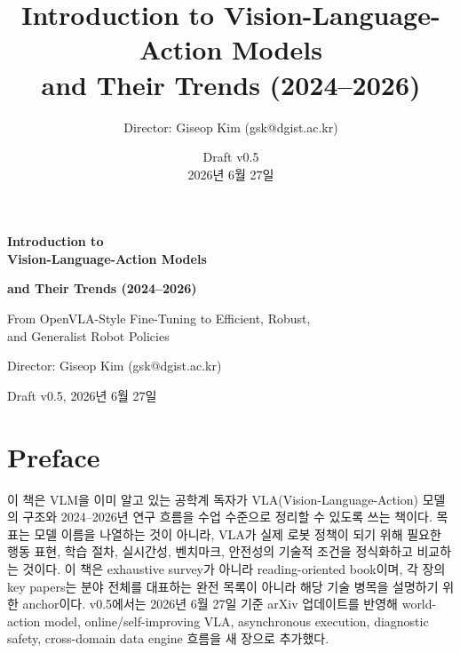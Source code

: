 \documentclass[11pt,a4paper,openany,twoside]{book}
\title{Introduction to Vision-Language-Action Models\\and Their Trends (2024--2026)}
\author{Director: Giseop Kim (gsk@dgist.ac.kr)}
\date{Draft v0.5 \\ 2026년 6월 27일}
\begin{document}
\frontmatter
\begin{titlepage}
  \centering
  \vspace*{22mm}
  {\sffamily\bfseries\Huge Introduction to\\Vision-Language-Action Models\par}
  \vspace{4mm}
  {\sffamily\bfseries\LARGE and Their Trends (2024--2026)\par}
  \vspace{10mm}
  {\Large From OpenVLA-Style Fine-Tuning to Efficient, Robust,\\and Generalist Robot Policies\par}
  \vspace{14mm}
  \vfill
  {\large Director: Giseop Kim (gsk@dgist.ac.kr)\par}
  \vspace{2mm}
  {\large Draft v0.5, 2026년 6월 27일\par}
\end{titlepage}

\chapter*{Preface}
이 책은 VLM을 이미 알고 있는 공학계 독자가 VLA(Vision-Language-Action) 모델의 구조와 2024--2026년 연구 흐름을 수업 수준으로 정리할 수 있도록 쓰는 책이다. 목표는 모델 이름을 나열하는 것이 아니라, VLA가 실제 로봇 정책이 되기 위해 필요한 행동 표현, 학습 절차, 실시간성, 벤치마크, 안전성의 기술적 조건을 정식화하고 비교하는 것이다. 이 책은 exhaustive survey가 아니라 reading-oriented book이며, 각 장의 key papers는 분야 전체를 대표하는 완전 목록이 아니라 해당 기술 병목을 설명하기 위한 anchor이다. v0.5에서는 2026년 6월 27일 기준 arXiv 업데이트를 반영해 world-action model, online/self-improving VLA, asynchronous execution, diagnostic safety, cross-domain data engine 흐름을 새 장으로 추가했다.
\end{document}
